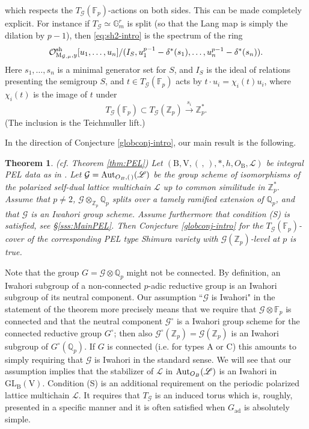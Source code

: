 \documentclass[reqno, 10pt]{amsart}
\newcommand{\sL}{\ensuremath{\mathscr{L}}\xspace}
\newcommand{\BF}{\ensuremath{\mathbb {F}}\xspace}
\newcommand{\BG}{\ensuremath{\mathbb {G}}\xspace}
\newcommand{\BQ}{\ensuremath{\mathbb {Q}}\xspace}
\newcommand{\BZ}{\ensuremath{\mathbb {Z}}\xspace}
\newcommand{\CG}{\ensuremath{\mathcal {G}}\xspace}
\newcommand{\CL}{\ensuremath{\mathcal {L}}\xspace}
\newcommand{\CO}{\ensuremath{\mathcal {O}}\xspace}
\newcommand{\RB}{\ensuremath{\mathrm {B}}\xspace}
\newcommand{\RV}{\ensuremath{\mathrm {V}}\xspace}
\newcommand{\ad}{{\mathrm{ad}}}
\newcommand{\GL}{\mathrm{GL}}
\newtheorem{theorem}[subsubsection]{Theorem}
\theoremstyle{definition}
\numberwithin{equation}{subsection}
\numberwithin{subsubsection}{subsection}
\newcommand{\Mloc}{{\rm M}}
\begin{document}
 which respects the $T_\CG(\BF_p)$-actions on both sides.  This can be made completely explicit. For instance if 
 $T_\CG\simeq \BG_m^r$ is split (so that the Lang map is simply the dilation by $p-1$), then  \eqref{eq:sh2-intro} is the spectrum of the ring
\[
\CO^{\rm sh}_{\Mloc_{\CG,\mu}, y}[u_1, \ldots, u_n]/(I_S, u_1^{p-1}-\delta^*(s_1), \ldots , u_n^{p-1}-\delta^*(s_n)).
\]
Here $s_1, \ldots, s_n$ is a minimal generator set for $S$, and $I_S$ is the ideal of relations presenting the semigroup $S$, and  $t\in T_\CG(\BF_p)$ acts by $t\cdot u_i=\chi_i(t) u_i$, where $\chi_i(t)$ is the image of $t$ under
\[
T_\CG(\BF_p) \subset T_\CG(\BZ_p)\xrightarrow{s_i} \BZ_p^*.
\]
(The inclusion is the Teichmuller lift.)
 
  In the direction of Conjecture \ref{globconj-intro}, our main result is the following.
 
\begin{theorem}\label{thm:PEL-intro} (cf. Theorem \ref{thm:PEL})
 Let $(\RB,\RV,( \,,\,), *, h, O_\RB, \CL )$ be integral PEL data as in \cite[Ch. 6]{RZbook}. Let
 $\CG={\rm Aut}_{O_B,(\, )}(\mathscr L)$ be
 the group scheme of isomorphisms of the polarized self-dual lattice multichain $\sL$ up to common similitude in $\BZ_p^*$.  Assume that $p\neq 2$, 
 $\CG\otimes_{\BZ_p}\BQ_p$ splits over a tamely ramified extension of $\BQ_p$, and that $\CG$ is an Iwahori group scheme.
Assume furthermore  that condition (S) is satisfied, see \S \ref{sss:MainPEL}. 
 Then Conjecture  \ref{globconj-intro} for the 
 $T_\CG(\BF_p)$-cover of the corresponding PEL type Shimura variety  with $\CG(\BZ_p)$-level at $p$ is true.
 \end{theorem}
 
 Note that the group $G=\CG\otimes\BQ_p$ might not be connected.
 By definition, an Iwahori subgroup of a non-connected $p$-adic reductive group   is an Iwahori subgroup of its neutral component. Our assumption ``$\CG$ is Iwahori" in the statement of the theorem more precisely means
 that we require that $\CG\otimes\BF_p$ is connected and that the neutral component $\CG^\circ$ is a Iwahori group scheme for the connected reductive group $G^\circ$; then also $\CG^\circ(\BZ_p)=\CG(\BZ_p)$ is an Iwahori subgroup of $G^\circ(\BQ_p)$.
 If $G$ is connected (i.e. for types A or C) this amounts to simply requiring that $\CG$ is Iwahori in the standard sense.
  We will see that our assumption implies that the stabilizer of $\CL$ in ${\rm Aut}_{O_B}(\mathscr L)$ is an Iwahori in $\GL_\RB(\RV)$. 
  Condition (S) is an additional requirement on the periodic polarized lattice multichain $\CL$. It requires that $T_\CG$ is an induced torus
  which is, roughly, presented in a specific manner and it is often satisfied when $G_\ad$ is absolutely simple.
 
\end{document}
